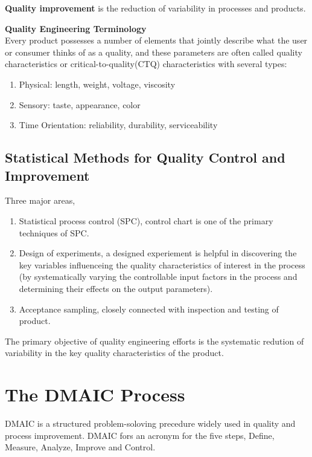\documentclass[12pt,oneside,a4paper]{article}
\numberwithin{equation}{section}
\begin{document}
\textbf{Quality improvement} is the reduction of variability in processes and products. 

\textbf{Quality Engineering Terminology}
\\ Every product possesses a number of elements that jointly describe what the user or consumer thinks of as a quality, and these parameters are often called quality characteristics or critical-to-quality(CTQ) characteristics with several types: 

\begin{enumerate}
\item Physical: length, weight, voltage, viscosity

\item Sensory: taste, appearance, color 

\item Time Orientation: reliability, durability, serviceability
\end{enumerate}


\subsection{Statistical Methods for Quality Control and Improvement}
Three major areas, 
\begin{enumerate}
\item Statistical process control (SPC), control chart is one of the primary techniques of SPC. 
\item Design of experiments, a designed experiement is helpful in discovering the key variables influenceing the quality characteristics of interest in the process (by systematically varying the controllable input factors in the process and determining their effects on the output parameters).
\item Acceptance sampling,  closely connected with inspection and testing of product. 
\end{enumerate}

The primary objective of quality engineering efforts is the systematic redution of variability in the key quality characteristics of the product.


\section{The DMAIC Process}

DMAIC is a structured problem-soloving precedure widely used in quality and process improvement.  DMAIC fors an acronym for the five steps, Define, Measure, Analyze, Improve and Control.  
\end{document}
